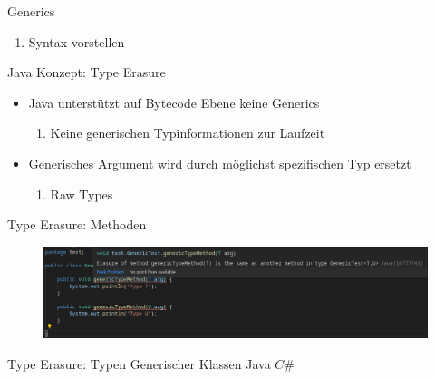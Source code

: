 \documentclass[11pt]{beamer}
\begin{document}

\begin{frame}{Generics}

	\begin{enumerate}
		\item Syntax vorstellen
	\end{enumerate}

\end{frame}


\begin{frame}{Java Konzept: Type Erasure}
\begin{itemize}
	\item Java unterstützt auf Bytecode Ebene keine Generics
	\begin{enumerate}
		\item Keine generischen Typinformationen zur Laufzeit
	\end{enumerate}
	\item Generisches Argument wird durch möglichst spezifischen Typ ersetzt
	\begin{enumerate}
		\item \glqq Raw Types\grqq
	\end{enumerate}

\end{itemize}
\end{frame}



\begin{frame}{Type Erasure: Methoden}
	\begin{figure}
		\includegraphics[width=\textwidth]{bilder/java_type_erasure.png}
	\end{figure}
\end{frame}

\begin{frame}{Type Erasure: Typen Generischer Klassen}
	Java
	$C\#$
\end{frame}
\end{document}

